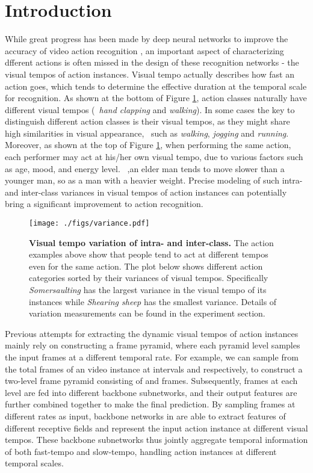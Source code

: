 \documentclass[10pt,twocolumn,letterpaper]{article}
\begin{document}
\section{Introduction}
\label{sec:intro}
While great progress has been made by deep neural networks to improve the accuracy of video action recognition \cite{slowfast, nonlocal, spn, trajconv, trajpool},
an important aspect of characterizing dfferent actions is often missed in the design of these recognition networks - the visual tempos of action instances. 
Visual tempo actually describes how fast an action goes, which tends to determine the effective duration at the temporal scale for recognition.
As shown at the bottom of Figure \ref{fig:variation}, action classes naturally have different visual tempos (\eg~\emph{hand clapping} and \emph{walking}).
In some cases the key to distinguish different action classes is their visual tempos, as they might share high similarities in visual appearance, \
such as \emph{walking}, \emph{jogging} and \emph{running}.
Moreover, as shown at the top of Figure \ref{fig:variation}, when performing the same action, each performer may act at his/her own visual tempo, due to various factors such as age, mood, and energy level.
\eg~,an elder man tends to move slower than a younger man, so as a man with a heavier weight.
Precise modeling of such intra- and inter-class variances in visual tempos of action instances can potentially bring a significant improvement to action recognition.


\begin{figure}[t]
    \centering
    \texttt{[image: ./figs/variance.pdf]}
    \caption{ 
        \textbf{Visual tempo variation of intra- and inter-class.}
        The action examples above show that people tend to act at different tempos even for the same action.
        The plot below shows different action categories sorted by their variances of visual tempos. 
        Specifically \emph{Somersaulting} has the largest variance in the visual tempo of its instances while \emph{Shearing sheep} has the smallest variance.
        Details of variation measurements can be found in the experiment section.
    }
    \label{fig:variation}
\end{figure}

Previous attempts \cite{slowfast, dtpn, spn} for extracting the dynamic visual tempos of action instances mainly rely on constructing a frame pyramid, 
where each pyramid level samples the input frames at a different temporal rate.
For example, we can sample from the total  frames of an video instance at intervals  and  respectively, to construct a two-level frame pyramid consisting of  and  frames.
Subsequently, frames at each level are fed into different backbone subnetworks, and their output features are further combined together to make the final prediction. 
By sampling frames at different rates as input, backbone networks in \cite{slowfast, dtpn} are able to extract features of different receptive fields and represent the input action instance at different visual tempos.
These backbone subnetworks thus jointly aggregate temporal information of both fast-tempo and slow-tempo, handling action instances at different temporal scales.
\end{document}
